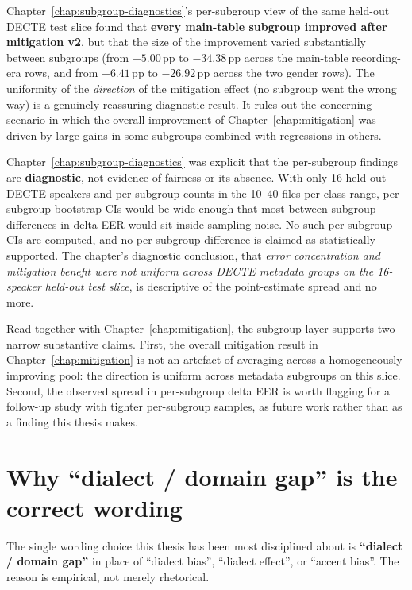 Chapter~\ref{chap:subgroup-diagnostics}'s per-subgroup view of the same held-out DECTE test
slice found that \textbf{every main-table subgroup improved after
mitigation v2}, but that the size of the improvement varied
substantially between subgroups (from $-5.00$\,pp to $-34.38$\,pp
across the main-table recording-era rows, and from $-6.41$\,pp to
$-26.92$\,pp across the two gender rows). The uniformity of the
\emph{direction} of the mitigation effect (no subgroup went the wrong
way) is a genuinely reassuring diagnostic result. It rules out
the concerning scenario in which the overall improvement of
Chapter~\ref{chap:mitigation} was driven by large gains in some subgroups combined
with regressions in others.

Chapter~\ref{chap:subgroup-diagnostics} was explicit that the per-subgroup findings are
\textbf{diagnostic}, not evidence of fairness or its absence. With
only 16 held-out DECTE speakers and per-subgroup counts in the
10--40 files-per-class range, per-subgroup bootstrap CIs would be
wide enough that most between-subgroup differences in delta EER
would sit inside sampling noise. No such per-subgroup CIs are
computed, and no per-subgroup difference is claimed as
statistically supported. The chapter's diagnostic conclusion, that
\emph{error concentration and mitigation benefit were not uniform
across DECTE metadata groups on the 16-speaker held-out test
slice}, is descriptive of the point-estimate spread and no more.

Read together with Chapter~\ref{chap:mitigation}, the subgroup layer supports two
narrow substantive claims. First, the overall mitigation result
in Chapter~\ref{chap:mitigation} is not an artefact of averaging across a
homogeneously-improving pool: the direction is uniform across
metadata subgroups on this slice. Second, the observed spread in
per-subgroup delta EER is worth flagging for a follow-up study
with tighter per-subgroup samples, as future work rather than as a
finding this thesis makes.


\section{Why ``dialect / domain gap'' is the correct wording}
\label{sec:discussion-wording-contract}

The single wording choice this thesis has been most disciplined
about is \textbf{``dialect / domain gap''} in place of ``dialect bias'',
``dialect effect'', or ``accent bias''. The reason is empirical, not
merely rhetorical.

